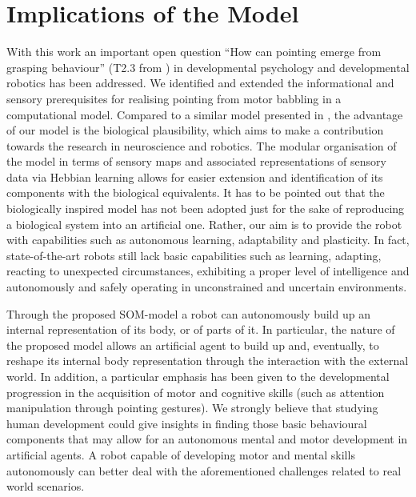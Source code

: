 \section{Implications of the Model}
With this work an important open question ``How can pointing emerge from grasping behaviour'' (T2.3 from \citep{Kaplan2006}) in developmental psychology and developmental robotics has been addressed. We identified and extended the informational and sensory prerequisites for realising pointing from motor babbling in a computational model. Compared to a similar model presented in \citep{SchillaciH11}, the advantage of our model is the biological plausibility, which aims to make a contribution towards the research in neuroscience and robotics. The modular organisation of the model in terms of sensory maps and associated representations of sensory data via Hebbian learning allows for easier extension and identification of its components with the biological equivalents. It has to be pointed out that the biologically inspired model has not been adopted just for the sake of reproducing a biological system into an artificial one. Rather, our aim is to provide the robot with capabilities such as autonomous learning, 
adaptability and plasticity. In fact, state-of-the-art robots still lack basic capabilities such as learning, adapting, reacting to unexpected circumstances, exhibiting a proper level of intelligence and autonomously and safely operating in unconstrained and uncertain environments.

Through the proposed SOM-model a robot can autonomously build up an internal representation of its body, or of parts of it. In particular, the nature of the proposed model allows an artificial agent to build up and, eventually, to reshape its internal body representation through the interaction with the external world.
In addition, a particular emphasis has been given to the developmental progression in the acquisition of motor and cognitive skills (such as attention manipulation through pointing gestures). We strongly believe that studying human development could give insights in finding those basic behavioural components that may allow for an autonomous mental and motor development in artificial agents. A robot capable of developing motor and mental skills autonomously can better deal with the aforementioned challenges related to real world scenarios.


